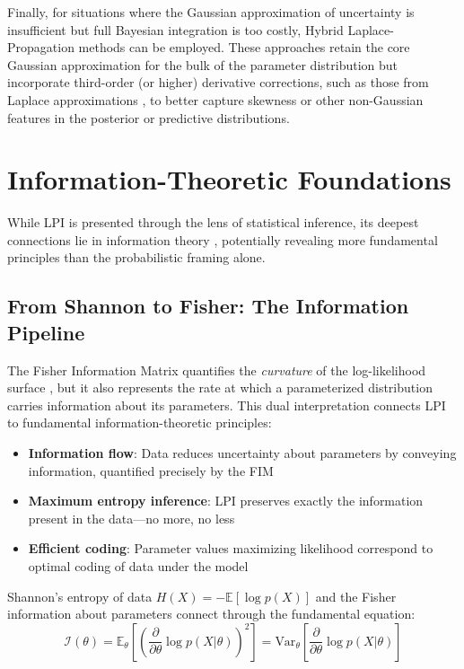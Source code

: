 \documentclass[11pt]{article}
\begin{document}
Finally, for situations where the Gaussian approximation of uncertainty is insufficient but full Bayesian integration is too costly, Hybrid Laplace-Propagation methods can be employed. These approaches retain the core Gaussian approximation for the bulk of the parameter distribution but incorporate third-order (or higher) derivative corrections, such as those from Laplace approximations \cite{tierney1986accurate}, to better capture skewness or other non-Gaussian features in the posterior or predictive distributions.

\section{Information-Theoretic Foundations}
While LPI is presented through the lens of statistical inference, its deepest connections lie in information theory \cite{cover2006elements, kullback1959information}, potentially revealing more fundamental principles than the probabilistic framing alone.

\subsection{From Shannon to Fisher: The Information Pipeline}

The Fisher Information Matrix quantifies the \textit{curvature} of the log-likelihood surface \cite{fisher1925statistical}, but it also represents the rate at which a parameterized distribution carries information about its parameters. This dual interpretation connects LPI to fundamental information-theoretic principles:

\begin{itemize}
\item \textbf{Information flow}: Data reduces uncertainty about parameters by conveying information, quantified precisely by the FIM
\item \textbf{Maximum entropy inference}: LPI preserves exactly the information present in the data---no more, no less
\item \textbf{Efficient coding}: Parameter values maximizing likelihood correspond to optimal coding of data under the model
\end{itemize}

Shannon's entropy of data $H(X) = -\mathbb{E}[\log p(X)]$ and the Fisher information about parameters connect through the fundamental equation:
\begin{equation}
\mathcal{I}(\theta) = \mathbb{E}_\theta\left[\left(\frac{\partial}{\partial\theta}\log p(X|\theta)\right)^2\right] = \text{Var}_\theta\left[\frac{\partial}{\partial\theta}\log p(X|\theta)\right]
\end{equation}
\end{document}
